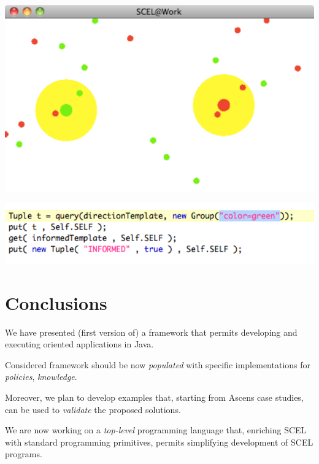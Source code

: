 \documentclass[11pt]{article}
\newcommand{\java}{\textsf{Java}}
\begin{document}
\begin{center}
\includegraphics[scale=0.45]{img/doublemobility}
\end{center}

\begin{center}
\includegraphics[scale=0.45]{img/groupcode}
\end{center}


\section{Conclusions} 

We have presented (first version of) a framework that permits developing and
executing \SCEL{} oriented applications in \java{}.

Considered framework should be now \emph{populated} with
specific implementations for \emph{policies}, \emph{knowledge}. 

Moreover, we plan to develop examples that, starting from Ascens case studies, can be used to \emph{validate}
the proposed solutions.

We are now working on a \emph{top-level} programming language that, enriching SCEL
with standard programming primitives, permits simplifying development of SCEL programs.



\end{document}
